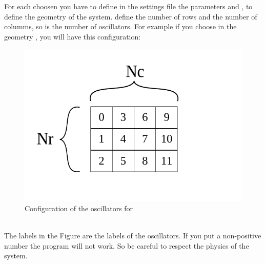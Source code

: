 \documentclass[1pt, a4paper]{article}
\begin{document}
\newpage
\noindent
For each  choosen you have to define in the settings file the parameters  and , to define the geometry of the system.  define the number of rows and  the number of columms, so  is the number of oscillators. For example if you choose  in the geometry , you will have this configuration:\\
\begin{figure}[htbp]
    \centering
    \includegraphics[scale=0.8]{figures/os_table.pdf}
    \caption{Configuration of the oscillators for }
    \label{fig:os_table}
\end{figure}\\
\noindent
The labels in the Figure are the labels of the oscillators. If you put a non-positive number the program will not work. So be careful to respect the physics of the system.
\end{document}
